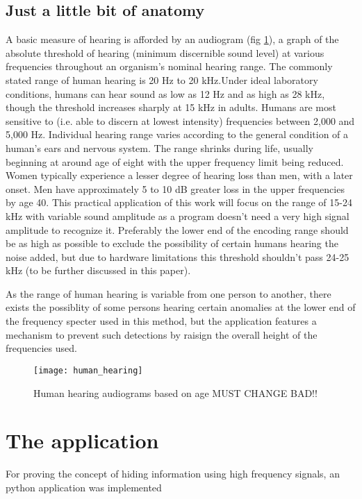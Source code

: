 \documentclass[12pt]{report}
\begin{document}
\section{Just a little bit of anatomy}
A basic measure of hearing is afforded by an audiogram (fig \ref{fig:human_hearing}), a graph of the absolute threshold of hearing (minimum discernible sound level) at various frequencies throughout an organism's nominal hearing range. The commonly stated range of human hearing is 20 Hz to 20 kHz.Under ideal laboratory conditions, humans can hear sound as low as 12 Hz and as high as 28 kHz, though the threshold increases sharply at 15 kHz in adults. Humans are most sensitive to (i.e. able to discern at lowest intensity) frequencies between 2,000 and 5,000 Hz. Individual hearing range varies according to the general condition of a human's ears and nervous system. The range shrinks during life, usually beginning at around age of eight with the upper frequency limit being reduced. Women typically experience a lesser degree of hearing loss than men, with a later onset. Men have approximately 5 to 10 dB greater loss in the upper frequencies by age 40\cite{note6}.
This practical application of this work will focus on the range of 15-24 kHz with variable  sound amplitude as a program doesn't need a very high signal amplitude to recognize it. Preferably the lower end of the encoding range should be as high as possible to exclude the possibility of certain humans hearing the noise added, but due to hardware limitations this threshold shouldn't pass 24-25 kHz (to be further discussed in this paper).

As the range of human hearing is variable from one person to another, there exists the possiblity of some persons hearing certain anomalies at the lower end of the frequency specter used in this method, but the application features a mechanism to prevent such detections by raisign the overall height of the frequencies used.

\begin{figure}[h]
\centering
\texttt{[image: human\_hearing]}
\caption{Human hearing audiograms based on age\cite{note7} MUST CHANGE BAD!!}
\label{fig:human_hearing}
\end{figure}

\chapter{The application}
For proving the concept of hiding information using high frequency signals, an python application was implemented
\end{document}
